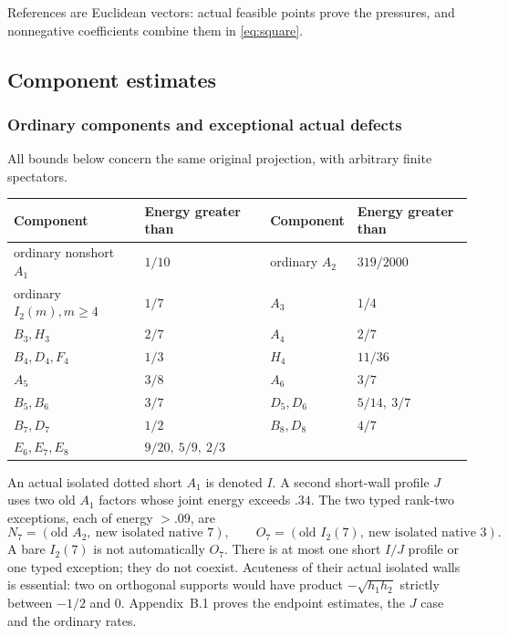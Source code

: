 \documentclass[11pt]{article}
\theoremstyle{remark}\newtheorem{remark}[theorem]{Remark}
\numberwithin{equation}{section}
\begin{document}
References are Euclidean vectors: actual feasible points prove the pressures, and nonnegative coefficients combine them in \eqref{eq:square}.

\subsection{Component estimates}
\label{compact:sec:components}
\subsubsection{Ordinary components and exceptional actual defects}
All bounds below concern the same original projection, with
arbitrary finite spectators.
\begin{center}\small
\begin{tabular}{ll@{\qquad}ll}
\toprule
Component&Energy greater than&Component&Energy greater than\\ \midrule
ordinary nonshort \(A_1\)&\(1/10\)&ordinary \(A_2\)&\(319/2000\)\\
ordinary \(I_2(m),m\geq4\)&\(1/7\)&\(A_3\)&\(1/4\)\\
\(B_3,H_3\)&\(2/7\)&\(A_4\)&\(2/7\)\\
\(B_4,D_4,F_4\)&\(1/3\)&\(H_4\)&\(11/36\)\\
\(A_5\)&\(3/8\)&\(A_6\)&\(3/7\)\\
\(B_5,B_6\)&\(3/7\)&\(D_5,D_6\)&\(5/14,\ 3/7\)\\
\(B_7,D_7\)&\(1/2\)&\(B_8,D_8\)&\(4/7\)\\
\(E_6,E_7,E_8\)&\(9/20,\ 5/9,\ 2/3\)&&\\ \bottomrule
\end{tabular}
\end{center}
An actual isolated dotted short \(A_1\) is denoted \(I\).
A second short-wall profile \(J\) uses two old \(A_1\) factors
whose joint energy exceeds \(.34\).
The two typed rank-two exceptions, each of energy \(>.09\), are
 \[
 N_7=(\text{old }A_2,\ \text{new isolated native }7),\qquad
 O_7=(\text{old }I_2(7),\ \text{new isolated native }3).
\]
A bare \(I_2(7)\) is not automatically \(O_7\).
There is at most one short \(I/J\) profile or one typed exception;
they do not coexist. Acuteness of their actual isolated walls
is essential: two on orthogonal supports would have product
 \(-\sqrt{h_1h_2}\) strictly between \(-1/2\) and \(0\).
Appendix~B.1 proves the endpoint estimates,
the \(J\) case and the ordinary rates.
\end{document}
